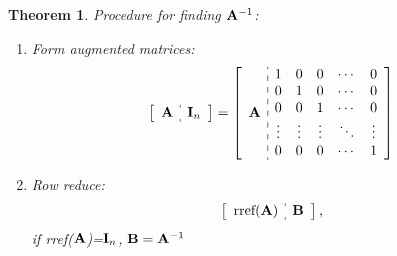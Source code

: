\documentclass[12pt, a4paper]{article}
\newtheorem{thm}{Theorem}[subsection]
\def\matrixA{\vb{A}}
\def\matrixB{\vb{B}}
\def\matrixI{\vb{I}}
\begin{document}
\begin{thm}
	Procedure for finding $\matrixA^{-1}$:
	\begin{enumerate}
		\item Form augmented matrices: \[\left[\begin{array}{c:c}\matrixA&\matrixI_n\end{array}\right]=\left[\begin{array}{c:c}\matrixA&\begin{matrix}1&0&0&\cdots&0\\0&1&0&\cdots&0\\0&0&1&\cdots&0\\\vdots&\vdots&\vdots&\ddots&\vdots\\0&0&0&\cdots&1\end{matrix}\end{array}\right]\]
		\item Row reduce: \[\left[\begin{array}{c:c}\text{rref}(\matrixA)&\matrixB\end{array}\right],\] if rref($\matrixA$)=$\matrixI_n$, $\matrixB=\matrixA^{-1}$
	\end{enumerate}
\end{thm}
\end{document}
